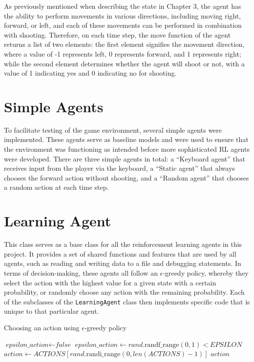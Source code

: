 As previously mentioned when describing the state in Chapter 3, the agent has the ability to perform movements in various directions, including moving right, forward, or left, and each of these movements can be performed in combination with shooting. Therefore, on each time step, the move function of the agent returns a list of two elements: the first element signifies the movement direction, where a value of -1 represents left, 0 represents forward, and 1 represents right; while the second element determines whether the agent will shoot or not, with a value of 1 indicating yes and 0 indicating no for shooting.


\section{Simple Agents}
To facilitate testing of the game environment, several simple agents were implemented. These agents serve as baseline models and were used to ensure that the environment was functioning as intended before more sophisticated RL agents were developed. There are three simple agents in total: a ``Keyboard agent'' that receives input from the player via the keyboard, a ``Static agent'' that always chooses the forward action without shooting, and a ``Random agent'' that chooses a random action at each time step. 

\section{Learning Agent}
This class serves as a base class for all the reinforcement learning agents in this project. It provides a set of shared functions and features that are used by all agents, such as reading and writing data to a file and debugging statements. In terms of decision-making, these agents all follow an $\epsilon$-greedy policy, whereby they select the action with the highest value for a given state with a certain probability, or randomly choose any action with the remaining probability. Each of the subclasses of the \texttt{LearningAgent} class then implements specific code that is unique to that particular agent.

\begin{algorithm}
\caption{Choosing an action using $\epsilon$-greedy policy}
\begin{algorithmic}[1]
    \State $\textit{epsilon\_action} \gets \textit{false}$
     
        \State $\textit{epsilon\_action} \gets rand.\text{randf\_range}(0,1) < EPSILON$
            \State $action \gets ACTIONS [rand.\text{randi\_range}(0,len(ACTIONS) - 1)]$  
        \EndIf
    \EndIf
    \State \Return $action$
\EndFunction
\end{algorithmic}
\end{algorithm}

